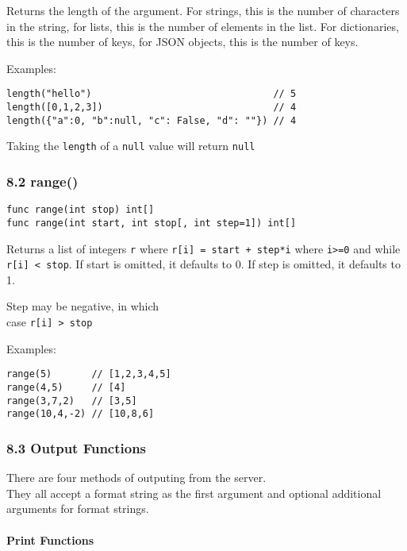 \documentclass[]{article}
\begin{document}
Returns the length of the argument. For strings, this is the number of
characters in the string, for lists, this is the number of elements in
the list. For dictionaries, this is the number of keys, for JSON
objects, this is the number of keys.

Examples:

\begin{verbatim}
length("hello")                                // 5
length([0,1,2,3])                              // 4
length({"a":0, "b":null, "c": False, "d": ""}) // 4
\end{verbatim}

Taking the \texttt{length} of a \texttt{null} value will return
\texttt{null}

\subsubsection{8.2 range()}\label{range}

\begin{verbatim}
func range(int stop) int[]
func range(int start, int stop[, int step=1]) int[]
\end{verbatim}

Returns a list of integers \texttt{r} where
\texttt{r{[}i{]} = start + step*i} where \texttt{i\textgreater{}=0} and
while \texttt{r{[}i{]} \textless{} stop}. If start is omitted, it
defaults to 0. If step is omitted, it defaults to 1.

Step may be negative, in which\\case
\texttt{r{[}i{]} \textgreater{} stop}

Examples:

\begin{verbatim}
range(5)       // [1,2,3,4,5]
range(4,5)     // [4]
range(3,7,2)   // [3,5]
range(10,4,-2) // [10,8,6]
\end{verbatim}

\subsubsection{8.3 Output Functions}\label{output-functions}

There are four methods of outputing from the server.\\They all accept a
format string as the first argument and optional additional arguments
for format strings.

\paragraph{Print Functions}\label{print-functions}
\end{document}
